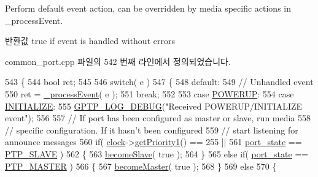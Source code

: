 Perform default event action, can be overridden by media specific actions in \+\_\+process\+Event. 

\begin{DoxyReturn}{반환값}
true if event is handled without errors 
\end{DoxyReturn}


common\+\_\+port.\+cpp 파일의 542 번째 라인에서 정의되었습니다.


\begin{DoxyCode}
543 \{
544     \textcolor{keywordtype}{bool} ret;
545 
546     \textcolor{keywordflow}{switch}( e )
547     \{
548     \textcolor{keywordflow}{default}:
549         \textcolor{comment}{// Unhandled event}
550         ret = \hyperlink{class_common_port_a8fdf705ad3f9d8794555fe1c611c19ec}{\_processEvent}( e );
551         \textcolor{keywordflow}{break};
552 
553     \textcolor{keywordflow}{case} \hyperlink{ieee1588_8hpp_a5667b805d857c6d28f83f6038a0272d3a406cd6aebc015d1776ef6cf24aa6ec76}{POWERUP}:
554     \textcolor{keywordflow}{case} \hyperlink{ieee1588_8hpp_a5667b805d857c6d28f83f6038a0272d3ab0c48e95b68bff1f7820e23b8fd0bc98}{INITIALIZE}:
555         \hyperlink{gptp__log_8hpp_ae4c6efe7c9cf6d7d3bbd28a0fd087d61}{GPTP\_LOG\_DEBUG}(\textcolor{stringliteral}{"Received POWERUP/INITIALIZE event"});
556 
557         \textcolor{comment}{// If port has been configured as master or slave, run media}
558         \textcolor{comment}{// specific configuration. If it hasn't been configured}
559         \textcolor{comment}{// start listening for announce messages}
560         \textcolor{keywordflow}{if}( \hyperlink{class_common_port_aa2bc8731fa5aeb5b033feebc2b67258c}{clock}->\hyperlink{class_i_e_e_e1588_clock_a3577d05b0d34d976c23354585d7516ad}{getPriority1}() == 255 ||
561             \hyperlink{class_common_port_ae66554126902ed959a3b296ddd3204e8}{port\_state} == \hyperlink{ptptypes_8hpp_a679431f1afc75d7bb9e972c022e53672a55a1a2eb4b93c65e3bba86278510cb04}{PTP\_SLAVE} )
562         \{
563             \hyperlink{class_common_port_aea8c32e0a9e71cdc96183437572fb153}{becomeSlave}( \textcolor{keyword}{true} );
564         \}
565         \textcolor{keywordflow}{else} \textcolor{keywordflow}{if}( \hyperlink{class_common_port_ae66554126902ed959a3b296ddd3204e8}{port\_state} == \hyperlink{ptptypes_8hpp_a679431f1afc75d7bb9e972c022e53672ab4c763cac238b6403615a62111b64aa4}{PTP\_MASTER} )
566         \{
567             \hyperlink{class_common_port_a03b0297c9770e83706826350b2815bc1}{becomeMaster}( \textcolor{keyword}{true} );
568         \}
569         \textcolor{keywordflow}{else}
570         \{

\end{DoxyCode}
